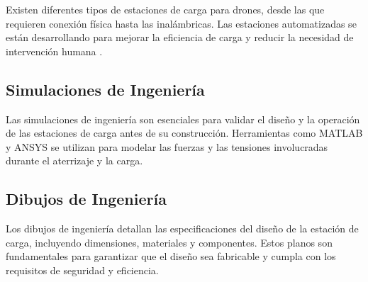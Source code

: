 Existen diferentes tipos de estaciones de carga para drones, desde las que requieren conexión física hasta las inalámbricas. Las estaciones automatizadas se están desarrollando para mejorar la eficiencia de carga y reducir la necesidad de intervención humana \cite{Lopez2023}.

\subsection{Simulaciones de Ingeniería}

Las simulaciones de ingeniería son esenciales para validar el diseño y la operación de las estaciones de carga antes de su construcción. Herramientas como MATLAB y ANSYS se utilizan para modelar las fuerzas y las tensiones involucradas durante el aterrizaje y la carga.

\subsection{Dibujos de Ingeniería}

Los dibujos de ingeniería detallan las especificaciones del diseño de la estación de carga, incluyendo dimensiones, materiales y componentes. Estos planos son fundamentales para garantizar que el diseño sea fabricable y cumpla con los requisitos de seguridad y eficiencia.


